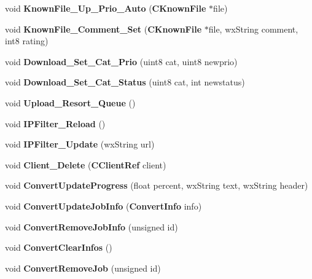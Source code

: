 \begin{DoxyCompactItemize}
\item 
void {\bfseries KnownFile\_\-Up\_\-Prio\_\-Auto} ({\bf CKnownFile} $\ast$file)\label{namespaceMuleNotify_a9dcf75bd6fa9a3a7592b6daa0fe1e0f0}

\item 
void {\bfseries KnownFile\_\-Comment\_\-Set} ({\bf CKnownFile} $\ast$file, wxString comment, int8 rating)\label{namespaceMuleNotify_a16fb7dcd02684d7ca1b8b3156156eeae}

\item 
void {\bfseries Download\_\-Set\_\-Cat\_\-Prio} (uint8 cat, uint8 newprio)\label{namespaceMuleNotify_a019807ae3a42ae59468dce7832379884}

\item 
void {\bfseries Download\_\-Set\_\-Cat\_\-Status} (uint8 cat, int newstatus)\label{namespaceMuleNotify_a48c7e4caa8fca4b48489ac49f2faa223}

\item 
void {\bfseries Upload\_\-Resort\_\-Queue} ()\label{namespaceMuleNotify_ab06dc6acef3b5d7294138519d665185e}

\item 
void {\bfseries IPFilter\_\-Reload} ()\label{namespaceMuleNotify_ab6be609fc76ab1c4812b392999356684}

\item 
void {\bfseries IPFilter\_\-Update} (wxString url)\label{namespaceMuleNotify_a401ca6acc30a3c9b25db86250bd33a82}

\item 
void {\bfseries Client\_\-Delete} ({\bf CClientRef} client)\label{namespaceMuleNotify_affb2e0d3d0d138531d6b378de6cf691d}

\item 
void {\bfseries ConvertUpdateProgress} (float percent, wxString text, wxString header)\label{namespaceMuleNotify_a6d0b745c64a71c3d8768855c3f8d9505}

\item 
void {\bfseries ConvertUpdateJobInfo} ({\bf ConvertInfo} info)\label{namespaceMuleNotify_ae2ab14feac7f0990e31f07149ce350aa}

\item 
void {\bfseries ConvertRemoveJobInfo} (unsigned id)\label{namespaceMuleNotify_aab97d67c43d3f9e9872de1b77a836412}

\item 
void {\bfseries ConvertClearInfos} ()\label{namespaceMuleNotify_a3e8e107292b47c576ee4f83d2ccf4120}

\item 
void {\bfseries ConvertRemoveJob} (unsigned id)\label{namespaceMuleNotify_a8a26fa1ecc00e7f3cc8f1819a9a7863e}


\end{DoxyCompactItemize}

